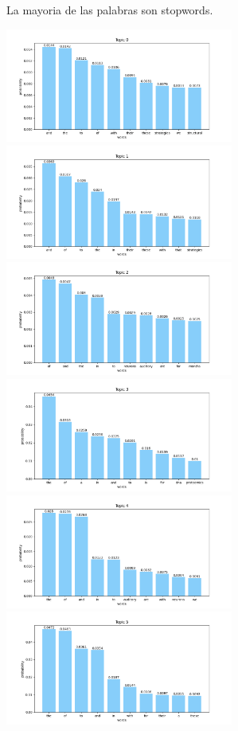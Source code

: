 \documentclass[10pt]{article} %
\begin{document}
	La mayoria de las palabras son stopwords.
	
	\begin{center}
		\includegraphics[width=7.5cm]{images/plots/test_8/topic_0.png}
		\includegraphics[width=7.5cm]{images/plots/test_8/topic_1.png}
		\includegraphics[width=7.5cm]{images/plots/test_8/topic_2.png}
		\includegraphics[width=7.5cm]{images/plots/test_8/topic_3.png}
		\includegraphics[width=7.5cm]{images/plots/test_8/topic_4.png}
		\includegraphics[width=7.5cm]{images/plots/test_8/topic_5.png}

\end{center}
\end{document}
